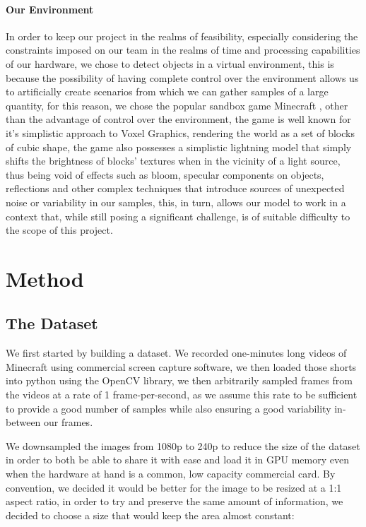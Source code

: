 \documentclass[10pt,journal,cspaper,compsoc]{IEEEtran}
\begin{document}
    
    \paragraph*{Our Environment}
    In order to keep our project in the realms of feasibility, especially considering the constraints imposed on our team in the 
    realms of time and processing capabilities of our hardware, we chose to detect objects in a virtual environment, this is because 
    the possibility of having complete control over the environment allows us to artificially create scenarios from which we can gather 
    samples of a large quantity, for this reason, we chose the popular sandbox game Minecraft \cite{Mojang-Minecraft}, other than 
    the advantage of control over the environment, the game is well known for it's simplistic approach to Voxel Graphics, rendering 
    the world as a set of blocks of cubic shape, the game also possesses a simplistic lightning model that simply shifts the brightness
    of blocks' textures when in the vicinity of a light source, thus being void of effects such as bloom, specular components on objects,
    reflections and other complex techniques that introduce sources of unexpected noise or variability in our samples, this, in turn, 
    allows our model to work in a context that, while still posing a significant challenge, is of suitable difficulty to the scope of 
    this project.



 \section{Method}   
    \subsection{The Dataset}
    We first started by building a dataset. We recorded one-minutes long videos of Minecraft using commercial screen capture software, we then loaded those shorts into python using the OpenCV library, we then arbitrarily sampled frames from the videos at a rate of 1 frame-per-second, as we assume this rate to be sufficient to provide a good number of samples while also ensuring a good variability in-between our frames. 

    We downsampled the images from 1080p to 240p to reduce the size of the dataset in order to both be able to share it with ease and load it in GPU memory even when the hardware at hand is a common, low capacity commercial card. By convention, we decided it would be better for the image to be resized at a 1:1 aspect ratio, in order to try and preserve the same amount of information, we decided to choose a size that would keep the area almost constant:
\end{document}
